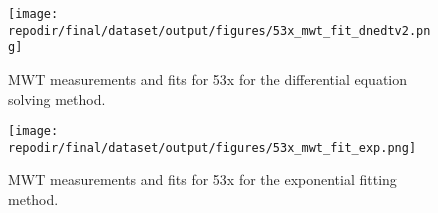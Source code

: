 \begin{figure}[]
\centering
\texttt{[image: \\repodir/final/dataset/output/figures/53x\_mwt\_fit\_dnedtv2.png]}
\caption{MWT measurements and fits for 53x for the differential equation solving method. }
\label{fig:SI_53x_mwt_fit_dnedtv2}
\end{figure}

\begin{figure}[]
\centering
\texttt{[image: \\repodir/final/dataset/output/figures/53x\_mwt\_fit\_exp.png]}
\caption{MWT measurements and fits for 53x for the exponential fitting method. }
\label{fig:SI_53x_mwt_fit_exp}
\end{figure}

